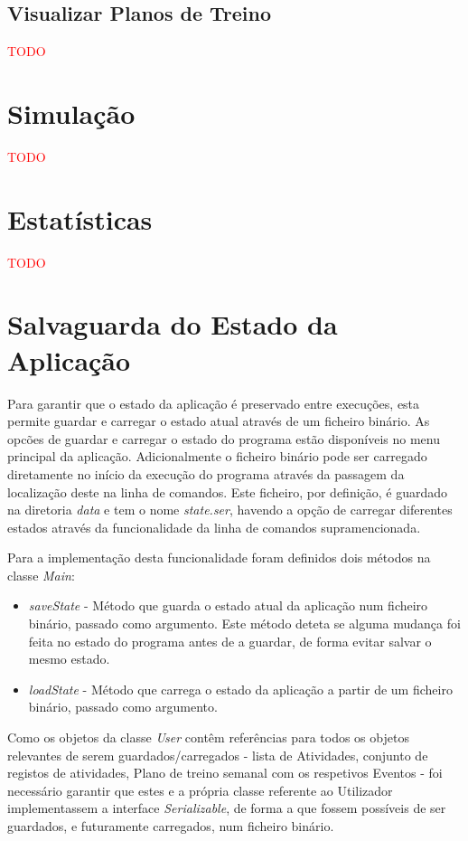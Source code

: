 \documentclass[a4paper,12pt]{scrreprt}
\begin{document}
    \subsection{Visualizar Planos de Treino}
    \textcolor{red}{TODO}

\section{Simulação}
    \label{sec:simulacao}
    \textcolor{red}{TODO}

\section{Estatísticas}
    \label{sec:estatisticas}
    \textcolor{red}{TODO}

\clearpage
\section{Salvaguarda do Estado da Aplicação}
    \label{sec:salvaguarda-estado}
Para garantir que o estado da aplicação é preservado entre execuções, esta
permite guardar e carregar o estado atual através de um ficheiro binário.
As opcões de guardar e carregar o estado do programa estão disponíveis no menu principal da aplicação. Adicionalmente o ficheiro binário pode ser carregado diretamente no início da execução do programa através da passagem da localização deste na linha de comandos.
Este ficheiro, por definição, é guardado na diretoria \textit{data} e tem o nome \textit{state.ser}, havendo a opção de carregar diferentes estados através da funcionalidade da linha de comandos supramencionada.

Para a implementação desta funcionalidade foram definidos dois métodos na classe \textit{Main}:
\begin{itemize}
    \item \textit{saveState} - Método que guarda o estado atual da aplicação num ficheiro binário, passado como argumento. Este método deteta se alguma mudança foi feita no estado do programa antes de a guardar, de forma evitar salvar o mesmo estado.
    \item \textit{loadState} - Método que carrega o estado da aplicação a partir de um ficheiro binário, passado como argumento.
\end{itemize}

Como os objetos da classe \textit{User} contêm referências para todos os objetos relevantes de serem guardados/carregados - lista de Atividades, conjunto de registos de atividades, Plano de treino semanal com os respetivos Eventos - foi necessário garantir que estes e a própria classe referente ao Utilizador implementassem a interface \textit{Serializable}, de forma a que fossem possíveis de ser guardados, e futuramente carregados, num ficheiro binário.
\end{document}
